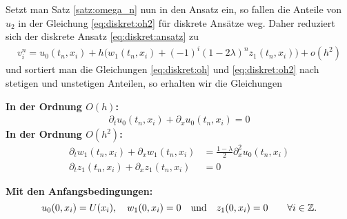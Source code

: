 Setzt man Satz \ref{satz:omega_n} nun in den Ansatz ein, so fallen die Anteile von $u_2$ in der Gleichung \eqref{eq:diskret:oh2} für diskrete Ansätze weg.
Daher reduziert sich der diskrete Ansatz \eqref{eq:diskret:ansatz} zu
\begin{align}\label{eq:osz:ansatz}
v^n_i = u_0(t_n, x_i) + h \bigl( w_1(t_n, x_i) + (-1)^i (1 - 2 \lambda)^n z_1(t_n, x_i) \bigr) + o(h^2)
\end{align}
und sortiert man die Gleichungen \eqref{eq:diskret:oh} und \eqref{eq:diskret:oh2} nach stetigen und unstetigen Anteilen, so erhalten wir die Gleichungen

\vspace{0.4cm}
\noindent \textbf{In der Ordnung $O(h)$:}
\begin{align}\label{eq:osz:oh}
\partial_t u_0(t_n, x_i) + \partial_x u_0(t_n, x_i) = 0
\end{align}
\vspace{0.4cm}
\noindent \textbf{In der Ordnung $O(h^2)$:}
\begin{align}\label{eq:osz:oh2}
\partial_t w_1(t_n, x_i) + \partial_x w_1(t_n, x_i) &= \frac {1 - \lambda}{2} \partial^2_x u_0(t_n, x_i)\\
\partial_t z_1(t_n, x_i) + \partial_x z_1(t_n, x_i) &= 0
\end{align}

\vspace{0.4cm}
\noindent \textbf{Mit den Anfangsbedingungen:}
\[ u_0(0, x_i) = U(x_i), \quad w_1(0, x_i) = 0 \quad \text{und} \quad z_1(0, x_i) = 0 \qquad \forall i \in \mathbb Z. \]
